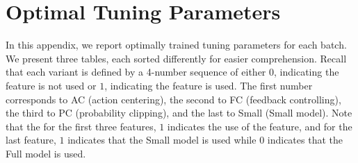 \chapter{Optimal Tuning Parameters}
\label{AppendixB}

In this appendix, we report optimally trained tuning parameters for each batch.  We present three tables, each sorted differently for easier comprehension.  Recall that each variant is defined by a 4-number sequence of either $0$, indicating the feature is not used or $1$, indicating the feature is used.  The first number corresponds to AC (action centering), the second to FC (feedback controlling), the third to PC (probability clipping), and the last to Small (Small model).  Note that the for the first three features, $1$ indicates the use of the feature, and for the last feature, $1$ indicates that the Small model is used while $0$ indicates that the Full model is used.


